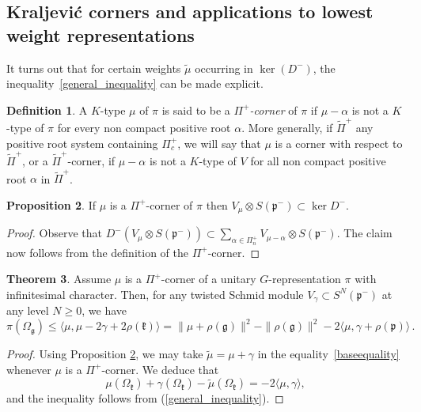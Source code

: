 \documentclass{amsart}[draft,11pt]
\newcommand{\fg}{{\mathfrak{g}}}
\newcommand{\fk}{{\mathfrak{k}}}
\newcommand{\fp}{{\mathfrak{p}}}
\numberwithin{equation}{section}
\theoremstyle{definition}
\newtheorem{theorem}{Theorem}[section]
\newtheorem{definition}[theorem]{Definition}
\newtheorem{proposition}[theorem]{Proposition}
\begin{document}
\subsection{Kraljevi\'c corners and applications to lowest weight representations}
It turns out that for certain weights $\tilde{\mu}$ occurring in $\ker(D^{-})$, the inequality~\eqref{general_inequality} can be made explicit. 
\begin{definition}
    \cite{kraljevic}
    A $K$-type $\mu$ of $\pi$ is said to be a \emph{$\Pi^+$-corner} of $\pi$ if $\mu-\alpha$ is not a $K$-type of $\pi$ for every non compact positive root $\alpha$. More generally, if $\widetilde{\Pi}^+$ any positive root system containing $\Pi_c^+$, we will say that $\mu$ is a corner with respect to $\widetilde{\Pi}^+$, or a $\widetilde{\Pi}^+$-corner, if $\mu-\alpha$ is not a $K$-type of $V$ for all non compact positive root $\alpha$ in $\widetilde{\Pi}^+$.
\end{definition}

\begin{proposition}\label{p:corner}
    If $\mu$ is a $\Pi^+$-corner of $\pi$  then $V_{\mu}\otimes S(\fp^-) \subset \ker D^-$.
\end{proposition}

\begin{proof}
Observe that $D^-(V_{\mu}\otimes S(\fp^-))\subset \sum_{\alpha\in \Pi^+_n} V_{\mu-\alpha}\otimes S(\fp^-)$. The claim now follows from the definition of the $\Pi^+$-corner.
\end{proof}

\begin{theorem}\label{t:corner}
    Assume $\mu$ is a $\Pi^+$-corner of a unitary $G$-representation $\pi$ with infinitesimal character. 
    Then, for any twisted Schmid module $V_\gamma\subset S^N(\fp^-)$ at any level $N\ge 0$, we have
    \begin{equation}
    \label{corner-inequality}
        \pi(\Omega_\fg)\leq
        \langle \mu,\mu-2\gamma+2\rho(\fk) \rangle
        = \|\mu+\rho(\fg)\|^2
        -\|\rho(\fg)\|^2
        -2\langle \mu,\gamma+\rho(\fp)\rangle\,.
    \end{equation}
\end{theorem}

\begin{proof}
Using Proposition \ref{p:corner}, we may take $\tilde{\mu}=\mu+\gamma$ in the  equality~\eqref{baseequality} whenever $\mu$ is a $\Pi^+$-corner. We deduce that
$$
\mu(\Omega_\fk)+\gamma(\Omega_\fk)-\tilde{\mu}(\Omega_\fk)=-2\langle \mu,\gamma\rangle,
$$
and the inequality follows from (\ref{general_inequality}).
\end{proof}
\end{document}
